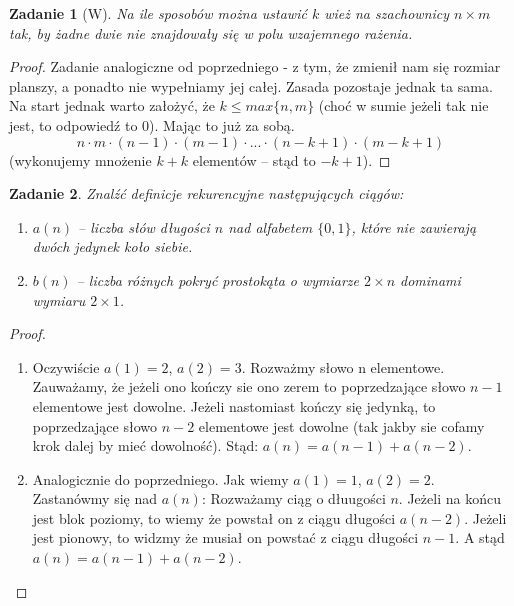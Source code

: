 \documentclass{mwbk}
\newtheorem{zad}{Zadanie}[chapter]
\begin{document}
\begin{zad}[W]
    Na ile sposobów można ustawić $k$ wież na szachownicy $n \times m$
    tak, by żadne dwie nie znajdowały się w polu wzajemnego rażenia.
\end{zad}
\begin{proof}
    Zadanie analogiczne od poprzedniego - z tym, że zmienił nam się
    rozmiar planszy, a ponadto nie wypełniamy jej całej. Zasada
    pozostaje jednak ta sama. Na start jednak warto założyć, że
    $k \leq max\{n, m\}$ (choć w sumie jeżeli tak nie jest, to
    odpowiedź to 0). Mając to już za sobą.
    \[n \cdot m \cdot (n-1) \cdot (m-1) \cdot ... \cdot (n - k +1) \cdot (m -k +1)\]
    (wykonujemy mnożenie $k + k$ elementów -- stąd to $-k + 1$).
\end{proof}

\begin{zad}
    Znalźć definicje rekurencyjne następujących ciągów:
    \begin{enumerate}
        \item $a(n)$ -- liczba słów długości $n$ nad alfabetem
              $\{0, 1\}$, które nie zawierają dwóch jedynek koło siebie.
        \item  $b(n)$ -- liczba różnych pokryć prostokąta o wymiarze
              $2 \times n$ dominami wymiaru $2 \times 1$.
    \end{enumerate}
\end{zad}
\begin{proof}
    \begin{enumerate}
        \item Oczywiście $a(1)=2$, $a(2)=3$.  Rozważmy słowo n elementowe.
              Zauważamy, że jeżeli ono kończy sie ono zerem to poprzedzające słowo $n-1$
              elementowe jest dowolne. Jeżeli nastomiast kończy się jedynką,
              to poprzedzające słowo $n-2$ elementowe jest dowolne
              (tak jakby sie cofamy krok dalej by mieć dowolność).
              Stąd: $a(n)=a(n-1)+a(n-2)$.
        \item Analogicznie do poprzedniego. Jak wiemy $a(1) = 1$, $a(2) = 2$. Zastanówmy się nad $a(n)$:
              Rozważamy ciąg o dłuugości $n$. Jeżeli na końcu jest blok poziomy,
              to wiemy że powstał on z ciągu długości $a(n-2)$.
              Jeżeli jest pionowy, to widzmy że musiał on powstać z ciągu długości $n-1$.
              A stąd $a(n) = a(n-1) + a(n-2)$.
    \end{enumerate}
\end{proof}
\end{document}
